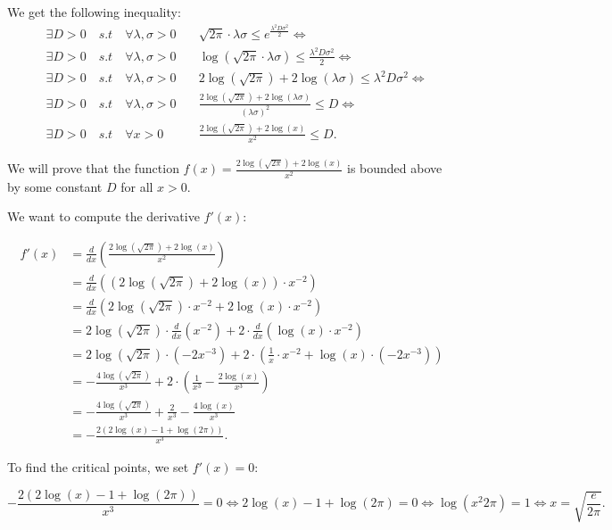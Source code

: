 \documentclass[a4 paper]{article}
\theoremstyle{boldStyle}
\theoremstyle{boldBlueStyle}
\theoremstyle{boldPurpleStyle}
\theoremstyle{boldRedStyle}
\begin{document}
We get the following inequality:
\begin{align*}  
&\exists D > 0 \quad {s.t} \quad \forall \lambda , \sigma >0 \quad &\sqrt{2\pi} \cdot \lambda \sigma \leq e^{\frac{\lambda^2 D \sigma^2}{2}} \iff \\
&\exists D > 0 \quad {s.t} \quad \forall \lambda , \sigma >0 \quad &\log(\sqrt{2\pi} \cdot \lambda \sigma) \leq \frac{\lambda^2 D \sigma^2}{2} \iff \\
&\exists D > 0 \quad {s.t} \quad \forall \lambda , \sigma >0 \quad &2\log(\sqrt{2\pi}) + 2\log(\lambda \sigma) \leq \lambda^2 D \sigma^2 \iff \\
&\exists D > 0 \quad {s.t} \quad \forall \lambda , \sigma >0 \quad &\frac{2\log(\sqrt{2\pi}) + 2\log(\lambda \sigma)}{(\lambda \sigma)^2} \leq D \iff \\
&\exists D > 0 \quad {s.t} \quad \forall x >0  &\frac{2\log(\sqrt{2\pi}) + 2\log(x)}{x^2} \leq D.
\end{align*}

We will prove that the function $f(x) = \frac{2\log(\sqrt{2\pi}) + 2\log(x)}{x^2}$ is bounded above by some constant $D$ for all $x > 0$. 

We want to compute the derivative \(f'(x)\):

\begin{align*}
f'(x) &= \frac{d}{dx} \left(\frac{2\log(\sqrt{2\pi}) + 2\log(x)}{x^2}\right) \\
&= \frac{d}{dx} \left( \left(2\log(\sqrt{2\pi}) + 2\log(x)\right) \cdot x^{-2} \right) \\
&= \frac{d}{dx} \left( 2\log(\sqrt{2\pi}) \cdot x^{-2} + 2\log(x) \cdot x^{-2} \right) \\
&= 2\log(\sqrt{2\pi}) \cdot \frac{d}{dx}(x^{-2}) + 2 \cdot \frac{d}{dx}(\log(x) \cdot x^{-2}) \\
&= 2\log(\sqrt{2\pi}) \cdot (-2x^{-3}) + 2 \cdot \left( \frac{1}{x} \cdot x^{-2} + \log(x) \cdot (-2x^{-3}) \right) \\
&= -\frac{4\log(\sqrt{2\pi})}{x^3} + 2 \cdot \left( \frac{1}{x^3} - \frac{2\log(x)}{x^3} \right) \\
&= -\frac{4\log(\sqrt{2\pi})}{x^3} + \frac{2}{x^3} - \frac{4\log(x)}{x^3} \\
&= -\frac{2(2\log(x) - 1 + \log(2\pi))}{x^3}.
\end{align*}

To find the critical points, we set \(f'(x) = 0\):

\[
-\frac{2(2\log(x) - 1 + \log(2\pi))}{x^3} = 0 \iff 2\log(x) - 1 + \log(2\pi) = 0 \iff \log(x^2 2\pi) = 1 \iff x = \sqrt{\frac{e}{2\pi}}.
\]
\end{document}
